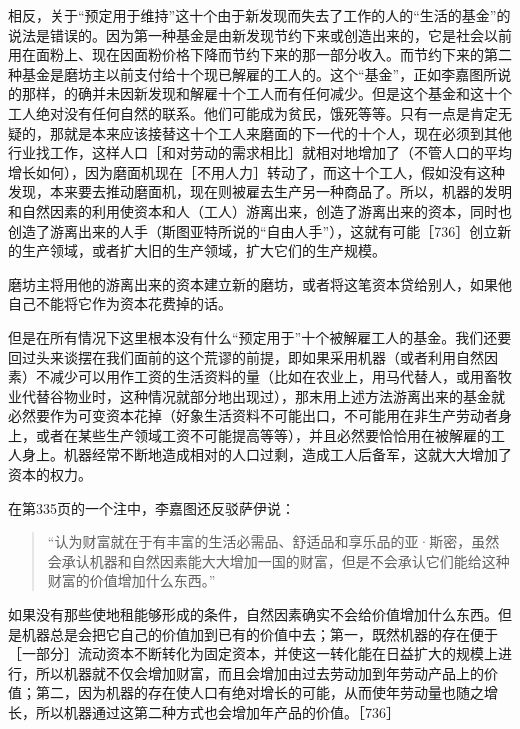 相反，关于“预定用于维持”这十个由于新发现而失去了工作的人的“生活的基金”的说法是错误的。因为第一种基金是由新发现节约下来或创造出来的，它是社会以前用在面粉上、现在因面粉价格下降而节约下来的那一部分收入。而节约下来的第二种基金是磨坊主以前支付给十个现已解雇的工人的。这个“基金”，正如李嘉图所说的那样，的确并未因新发现和解雇十个工人而有任何减少。但是这个基金和这十个工人绝对没有任何自然的联系。他们可能成为贫民，饿死等等。只有一点是肯定无疑的，那就是本来应该接替这十个工人来磨面的下一代的十个人，现在必须到其他行业找工作，这样人口［和对劳动的需求相比］就相对地增加了（不管人口的平均增长如何），因为磨面机现在［不用人力］转动了，而这十个工人，假如没有这种发现，本来要去推动磨面机，现在则被雇去生产另一种商品了。所以，机器的发明和自然因素的利用使资本和人（工人）游离出来，创造了游离出来的资本，同时也创造了游离出来的人手（斯图亚特所说的“自由人手”），这就有可能［736］创立新的生产领域，或者扩大旧的生产领域，扩大它们的生产规模。

磨坊主将用他的游离出来的资本建立新的磨坊，或者将这笔资本贷给别人，如果他自己不能将它作为资本花费掉的话。

但是在所有情况下这里根本没有什么“预定用于”十个被解雇工人的基金。我们还要回过头来谈摆在我们面前的这个荒谬的前提，即如果采用机器（或者利用自然因素）不减少可以用作工资的生活资料的量（比如在农业上，用马代替人，或用畜牧业代替谷物业时，这种情况就部分地出现过），那末用上述方法游离出来的基金就必然要作为可变资本花掉（好象生活资料不可能出口，不可能用在非生产劳动者身上，或者在某些生产领域工资不可能提高等等），并且必然要恰恰用在被解雇的工人身上。机器经常不断地造成相对的人口过剩，造成工人后备军，这就大大增加了资本的权力。

在第335页的一个注中，李嘉图还反驳萨伊说：

\begin{quote}{“认为财富就在于有丰富的生活必需品、舒适品和享乐品的亚·斯密，虽然会承认机器和自然因素能大大增加一国的财富，但是不会承认它们能给这种财富的价值增加什么东西。”}\end{quote}

如果没有那些使地租能够形成的条件，自然因素确实不会给价值增加什么东西。但是机器总是会把它自己的价值加到已有的价值中去；第一，既然机器的存在便于［一部分］流动资本不断转化为固定资本，并使这一转化能在日益扩大的规模上进行，所以机器就不仅会增加财富，而且会增加由过去劳动加到年劳动产品上的价值；第二，因为机器的存在使人口有绝对增长的可能，从而使年劳动量也随之增长，所以机器通过这第二种方式也会增加年产品的价值。［736］

